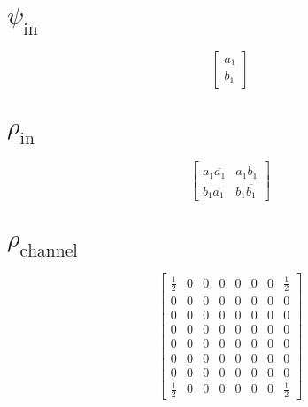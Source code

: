 \documentclass{article}
\begin{document}
\section*{$\psi_{\text{in}}$}
\begin{dmath*}
\left[\begin{matrix}a_{1}\\b_{1}\end{matrix}\right]
\end{dmath*}
\section*{$\rho_{\text{in}}$}
\begin{dmath*}
\left[\begin{matrix}a_{1} \overline{a_{1}} & a_{1} \overline{b_{1}}\\b_{1} \overline{a_{1}} & b_{1} \overline{b_{1}}\end{matrix}\right]
\end{dmath*}
\section*{$\rho_{\text{channel}}$}
\begin{dmath*}
\left[\begin{matrix}\frac{1}{2} & 0 & 0 & 0 & 0 & 0 & 0 & \frac{1}{2}\\0 & 0 & 0 & 0 & 0 & 0 & 0 & 0\\0 & 0 & 0 & 0 & 0 & 0 & 0 & 0\\0 & 0 & 0 & 0 & 0 & 0 & 0 & 0\\0 & 0 & 0 & 0 & 0 & 0 & 0 & 0\\0 & 0 & 0 & 0 & 0 & 0 & 0 & 0\\0 & 0 & 0 & 0 & 0 & 0 & 0 & 0\\\frac{1}{2} & 0 & 0 & 0 & 0 & 0 & 0 & \frac{1}{2}\end{matrix}\right]
\end{dmath*}
\end{document}
